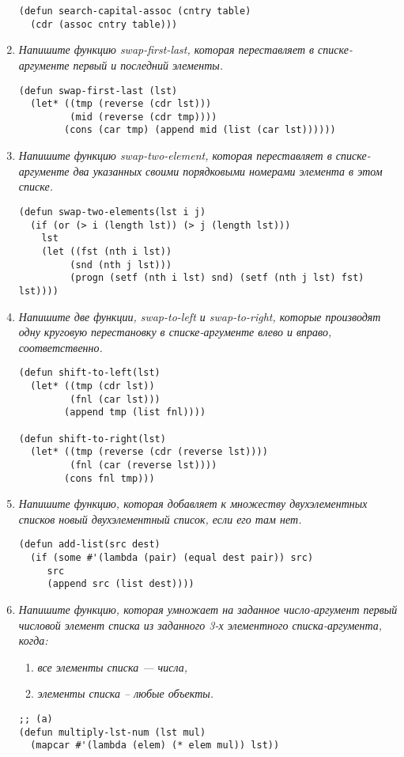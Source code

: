 \begin{enumerate}[wide=0pt]
\begin{lstlisting}
(defun search-capital-assoc (cntry table)
  (cdr (assoc cntry table)))
\end{lstlisting}
\item \textit{Напишите функцию swap-first-last, которая переставляет в списке-аргументе первый и последний элементы.} \newpage
\begin{lstlisting}
(defun swap-first-last (lst)
  (let* ((tmp (reverse (cdr lst)))
		 (mid (reverse (cdr tmp))))
		(cons (car tmp) (append mid (list (car lst))))))
\end{lstlisting}
\item \textit{Напишите функцию swap-two-element, которая переставляет в списке- аргументе два указанных своими порядковыми номерами элемента в этом списке.}
\begin{lstlisting}
(defun swap-two-elements(lst i j) 
  (if (or (> i (length lst)) (> j (length lst)))
    lst
    (let ((fst (nth i lst))
         (snd (nth j lst)))
         (progn (setf (nth i lst) snd) (setf (nth j lst) fst) lst))))
\end{lstlisting}
\item \textit{Напишите две функции, swap-to-left и swap-to-right, которые производят одну круговую перестановку в списке-аргументе влево и вправо, соответственно.}
\begin{lstlisting}
(defun shift-to-left(lst)
  (let* ((tmp (cdr lst))
		 (fnl (car lst)))
		(append tmp (list fnl))))
	
(defun shift-to-right(lst)
  (let* ((tmp (reverse (cdr (reverse lst))))
         (fnl (car (reverse lst))))
 	    (cons fnl tmp)))
\end{lstlisting}
\item \textit{Напишите функцию, которая добавляет к множеству двухэлементных списков новый двухэлементный список, если его там нет.}
\begin{lstlisting}	
(defun add-list(src dest)
  (if (some #'(lambda (pair) (equal dest pair)) src)
     src
     (append src (list dest))))
\end{lstlisting}
\item \textit{Напишите функцию, которая умножает на заданное число-аргумент первый числовой элемент списка из заданного 3-х элементного списка-аргумента, когда:}
\begin{enumerate}
	\item \textit{все элементы списка --- числа,}
	\item \textit{элементы списка -- любые объекты.}
\end{enumerate}
\begin{lstlisting}
;; (a)
(defun multiply-lst-num (lst mul)
  (mapcar #'(lambda (elem) (* elem mul)) lst))


\end{lstlisting}
\end{enumerate}
